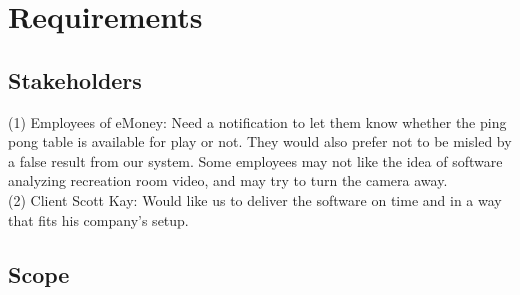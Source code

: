 \documentclass[11pt]{report}
\begin{document}


\chapter{Requirements}

\section{Stakeholders}

(1)	Employees of eMoney: Need a notification to let them know whether the ping pong table is available for play or not.  They would also prefer not to be misled by a false result from our system.  Some employees may not like the idea of software analyzing recreation room video, and may try to turn the camera away.\\
(2)	Client Scott Kay: Would like us to deliver the software on time and in a way that fits his company's setup.\\



\section{Scope}
\end{document}
